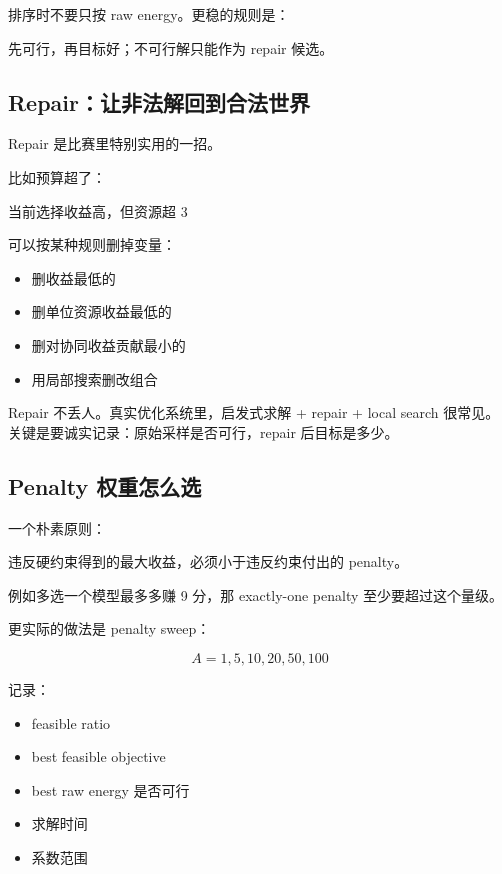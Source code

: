 \documentclass[UTF8,12pt,a4paper]{ctexart}
\begin{document}
排序时不要只按 raw energy。更稳的规则是：

\begin{GuideVerbatim}
先可行，再目标好；不可行解只能作为 repair 候选。
\end{GuideVerbatim}

\subsection*{Repair：让非法解回到合法世界}

Repair 是比赛里特别实用的一招。

比如预算超了：

\begin{GuideVerbatim}
当前选择收益高，但资源超 3
\end{GuideVerbatim}

可以按某种规则删掉变量：

\begin{itemize}
\item 删收益最低的
\item 删单位资源收益最低的
\item 删对协同收益贡献最小的
\item 用局部搜索删改组合
\end{itemize}

Repair 不丢人。真实优化系统里，启发式求解 + repair + local search 很常见。关键是要诚实记录：原始采样是否可行，repair 后目标是多少。

\subsection*{Penalty 权重怎么选}

一个朴素原则：

\begin{GuideVerbatim}
违反硬约束得到的最大收益，必须小于违反约束付出的 penalty。
\end{GuideVerbatim}

例如多选一个模型最多多赚 9 分，那 exactly-one penalty 至少要超过这个量级。

更实际的做法是 penalty sweep：

\[
A = 1, 5, 10, 20, 50, 100
\]

记录：

\begin{itemize}
\item feasible ratio
\item best feasible objective
\item best raw energy 是否可行
\item 求解时间
\item 系数范围
\end{itemize}
\end{document}
